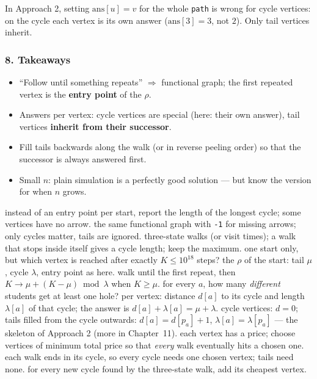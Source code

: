 \begin{warningbox}
In Approach 2, setting $\text{ans}[u] = v$ for the whole \texttt{path} is wrong for cycle vertices: on the cycle each vertex is its own answer ($\text{ans}[3] = 3$, not $2$). Only tail vertices inherit.
\end{warningbox}

\subsubsection*{8. Takeaways}

\begin{itemize}[leftmargin=*]
    \item ``Follow until something repeats'' $\Rightarrow$ functional graph; the first repeated vertex is the \textbf{entry point} of the $\rho$.
    \item Answers per vertex: cycle vertices are special (here: their own answer), tail vertices \textbf{inherit from their successor}.
    \item Fill tails backwards along the walk (or in reverse peeling order) so that the successor is always answered first.
    \item Small $n$: plain simulation is a perfectly good solution --- but know the  version for when $n$ grows.
\end{itemize}

\begin{variantsbox}
  {instead of an entry point per start, report the length of the longest cycle; some vertices have no arrow.}
  {the same functional graph with \texttt{-1} for missing arrows; only cycles matter, tails are ignored.}
  {three-state walks (or visit times); a walk that stops inside itself gives a cycle length; keep the maximum.}
  {one start only, but which vertex is reached after exactly $K \le 10^{18}$ steps?}
  {the $\rho$ of the start: tail $\mu$, cycle $\lambda$, entry point as here.}
  {walk until the first repeat, then $K \to \mu + (K - \mu) \bmod \lambda$ when $K \ge \mu$.}
  {for every $a$, how many \emph{different} students get at least one hole?}
  {per vertex: distance $d[a]$ to its cycle and length $\lambda[a]$ of that cycle; the answer is $d[a] + \lambda[a] = \mu + \lambda$.}
  {cycle vertices: $d = 0$; tails filled from the cycle outwards: $d[a] = d[p_a] + 1$, $\lambda[a] = \lambda[p_a]$ --- the skeleton of Approach 2 (more in Chapter~11).}
  {each vertex has a price; choose vertices of minimum total price so that \emph{every} walk eventually hits a chosen one.}
  {each walk ends in its cycle, so every cycle needs one chosen vertex; tails need none.}
  {for every new cycle found by the three-state walk, add its cheapest vertex.}
\end{variantsbox}
